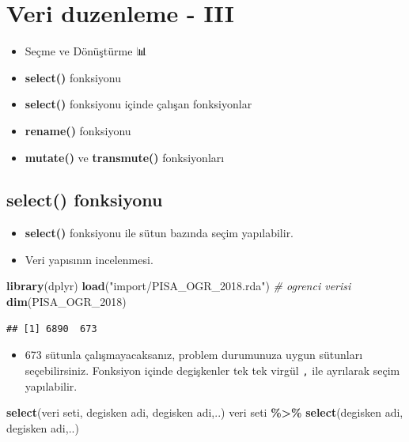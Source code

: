\documentclass[
  oneside]{book}
\newenvironment{Shaded}{\begin{snugshade}}{\end{snugshade}}
\newcommand{\CommentTok}[1]{\textcolor[rgb]{0.56,0.35,0.01}{\textit{#1}}}
\newcommand{\FunctionTok}[1]{\textcolor[rgb]{0.13,0.29,0.53}{\textbf{#1}}}
\newcommand{\NormalTok}[1]{#1}
\newcommand{\SpecialCharTok}[1]{\textcolor[rgb]{0.81,0.36,0.00}{\textbf{#1}}}
\newcommand{\StringTok}[1]{\textcolor[rgb]{0.31,0.60,0.02}{#1}}
\providecommand{\tightlist}{%
  \setlength{\itemsep}{0pt}\setlength{\parskip}{0pt}}
\begin{document}
\hypertarget{veri-duzenleme---iii}{%
\chapter{Veri duzenleme - III}\label{veri-duzenleme---iii}}

\begin{itemize}
\item
  Seçme ve Dönüştürme 📊
\item
  \textbf{select()} fonksiyonu
\item
  \textbf{select()} fonksiyonu içinde çalışan fonksiyonlar
\item
  \textbf{rename()} fonksiyonu
\item
  \textbf{mutate()} ve \textbf{transmute()} fonksiyonları
\end{itemize}

\hypertarget{select-fonksiyonu}{%
\section{select() fonksiyonu}\label{select-fonksiyonu}}

\begin{itemize}
\item
  \textbf{select()} fonksiyonu ile sütun bazında seçim yapılabilir.
\item
  Veri yapısının incelenmesi.
\end{itemize}

\begin{Shaded}
\begin{Highlighting}[]
\FunctionTok{library}\NormalTok{(dplyr)}
\FunctionTok{load}\NormalTok{(}\StringTok{"import/PISA\_OGR\_2018.rda"}\NormalTok{) }\CommentTok{\# ogrenci verisi}
\FunctionTok{dim}\NormalTok{(PISA\_OGR\_2018)}
\end{Highlighting}
\end{Shaded}

\begin{verbatim}
## [1] 6890  673
\end{verbatim}

\begin{itemize}
\tightlist
\item
  673 sütunla çalışmayacaksanız, problem durumunuza uygun sütunları seçebilirsiniz. Fonksiyon içinde degişkenler tek tek virgül \texttt{,} ile ayrılarak seçim yapılabilir.
\end{itemize}

\begin{Shaded}
\begin{Highlighting}[]
\FunctionTok{select}\NormalTok{(veri seti, degisken adi, degisken adi,..)}
\NormalTok{veri seti }\SpecialCharTok{\%\textgreater{}\%} \FunctionTok{select}\NormalTok{(degisken adi, degisken adi,..)}
\end{Highlighting}
\end{Shaded}
\end{document}
